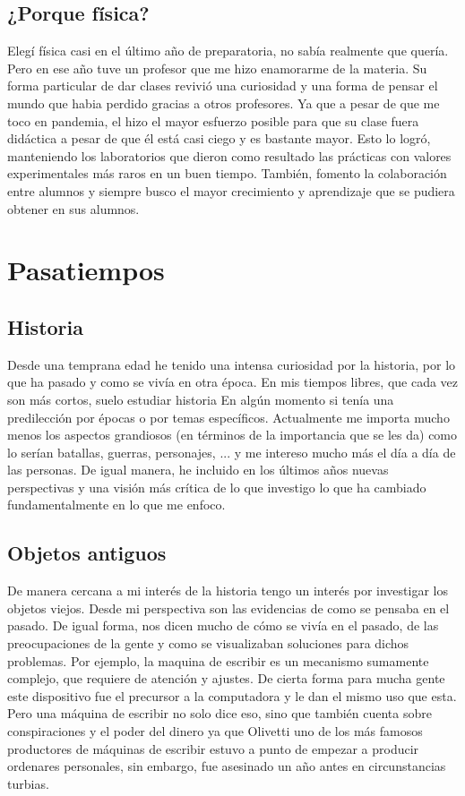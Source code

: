 \documentclass[letterpaper,12pt]{article}
\begin{document}
\subsection{¿Porque física?}
\tiny{Elegí física casi en el último año de preparatoria, no sabía realmente que quería.} \large{Pero en ese año tuve un profesor que me hizo enamorarme de la materia.} \tiny{Su forma particular de dar clases revivió una curiosidad y una forma de pensar el mundo que habia perdido gracias a otros profesores. Ya que a pesar de que me toco en pandemia, el hizo el mayor esfuerzo posible para que su clase fuera didáctica a pesar de que él está casi ciego y es bastante mayor. Esto lo logró, manteniendo los laboratorios que dieron como resultado las prácticas con valores experimentales más raros en un buen tiempo. También, fomento la colaboración entre alumnos y siempre busco el mayor crecimiento y aprendizaje que se pudiera obtener en sus alumnos.} 
\section{Pasatiempos}
\subsection{Historia}
\large{Desde una temprana edad he tenido una intensa curiosidad por la historia, por lo que ha pasado y como se vivía en otra época. En mis tiempos libres, que cada vez son más cortos, suelo estudiar historia} \tiny{En algún momento si tenía una predilección por épocas o por temas específicos. Actualmente me importa mucho menos los aspectos grandiosos (en términos de la importancia que se les da) como lo serían batallas, guerras, personajes, ... y me intereso mucho más el día a día de las personas. De igual manera, he incluido en los últimos años nuevas perspectivas y una visión más crítica de lo que investigo lo que ha cambiado fundamentalmente en lo que me enfoco.} 
\subsection{Objetos antiguos}
\large{De manera cercana a mi interés de la historia tengo un interés por investigar los objetos viejos.} \tiny{Desde mi perspectiva son las evidencias de como se pensaba en el pasado. De igual forma, nos dicen mucho de cómo se vivía en el pasado, de las preocupaciones de la gente y como se visualizaban soluciones para dichos problemas. Por ejemplo, la maquina de escribir es un mecanismo sumamente complejo, que requiere de atención y ajustes. De cierta forma para mucha gente este dispositivo fue el precursor a la computadora y le dan el mismo uso que esta. Pero una máquina de escribir no solo dice eso, sino que también cuenta sobre conspiraciones y el poder del dinero ya que Olivetti uno de los más famosos productores de máquinas de escribir estuvo a punto de empezar a producir ordenares personales, sin embargo, fue asesinado un año antes en circunstancias turbias.}
\end{document}

